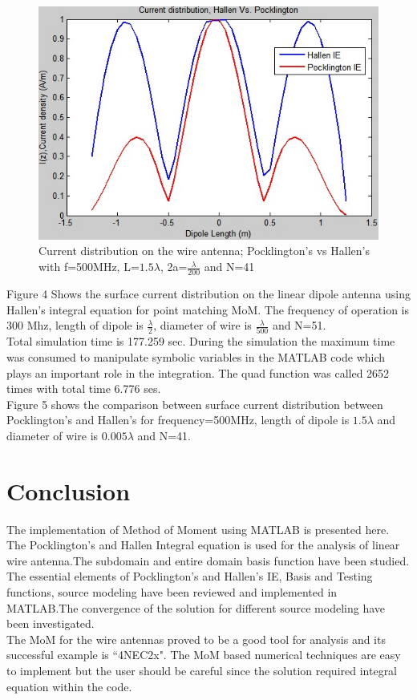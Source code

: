 \documentclass[aps,prstab,twocolumn,superscriptaddress,groupedaddress,showkeys,nofootinbib]{revtex4}  %
\begin{document}
\begin{figure}[here!]
\centering
\includegraphics[scale=0.5]{image5.jpg}
\caption{Current distribution on the wire antenna; Pocklington's vs Hallen's with f=500MHz, L=$1.5 \lambda$, 2a=$\frac{\lambda }{200}$ and N=41}
\end{figure}
Figure 4 Shows the surface current distribution on the linear dipole antenna using Hallen's integral equation for point matching MoM. The frequency of operation is 300 Mhz, length of dipole is $\frac{\lambda }{2}$, diameter of wire is $\frac{\lambda }{500}$ and N=51.\\
Total simulation time is 177.259 sec. During the simulation the maximum time was consumed to manipulate symbolic variables in the MATLAB code which plays an important role in the integration. The quad function was called 2652 times with total time 6.776 ses.\\
 Figure 5 shows the comparison between surface current distribution between Pocklington's and Hallen's for frequency=500MHz, length of dipole is $ 1.5 \lambda $ and diameter of wire is $ 0.005 \lambda $ and N=41.
\section{Conclusion}
The implementation of Method of Moment using MATLAB is presented here. The Pocklington's and Hallen Integral equation is used for the analysis of linear wire antenna.The subdomain and entire domain basis function have been studied. The essential elements of Pocklington's and Hallen's IE, Basis and Testing functions, source modeling have been reviewed and implemented in MATLAB.The convergence of the solution for different source modeling have been investigated.\\
 The MoM for the wire antennas proved to be a good tool for analysis and its successful example is ``4NEC2x". The MoM based numerical techniques are easy to implement but the user should be careful since the solution required integral equation within the code. 
\end{document}
